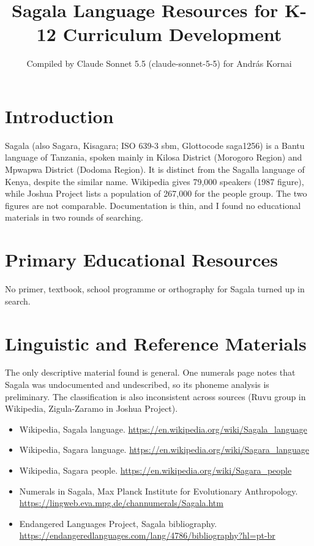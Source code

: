 \documentclass[12pt]{article}
\title{Sagala Language Resources for K-12 Curriculum Development}
\author{Compiled by Claude Sonnet 5.5 (claude-sonnet-5-5) for Andr\'as Kornai}
\date{}
\begin{document}
\maketitle

\section{Introduction}
Sagala (also Sagara, Kisagara; ISO 639-3 sbm, Glottocode saga1256) is a Bantu language of Tanzania, spoken mainly in Kilosa District (Morogoro Region) and Mpwapwa District (Dodoma Region). It is distinct from the Sagalla language of Kenya, despite the similar name. Wikipedia gives 79,000 speakers (1987 figure), while Joshua Project lists a population of 267,000 for the people group. The two figures are not comparable. Documentation is thin, and I found no educational materials in two rounds of searching.

\section{Primary Educational Resources}
No primer, textbook, school programme or orthography for Sagala turned up in search.

\section{Linguistic and Reference Materials}
The only descriptive material found is general. One numerals page notes that Sagala was undocumented and undescribed, so its phoneme analysis is preliminary. The classification is also inconsistent across sources (Ruvu group in Wikipedia, Zigula-Zaramo in Joshua Project).
\begin{itemize}
\item Wikipedia, Sagala language. \url{https://en.wikipedia.org/wiki/Sagala_language}
\item Wikipedia, Sagara language. \url{https://en.wikipedia.org/wiki/Sagara_language}
\item Wikipedia, Sagara people. \url{https://en.wikipedia.org/wiki/Sagara_people}
\item Numerals in Sagala, Max Planck Institute for Evolutionary Anthropology. \url{https://lingweb.eva.mpg.de/channumerals/Sagala.htm}
\item Endangered Languages Project, Sagala bibliography. \url{https://endangeredlanguages.com/lang/4786/bibliography?hl=pt-br}
\end{itemize}
\end{document}
